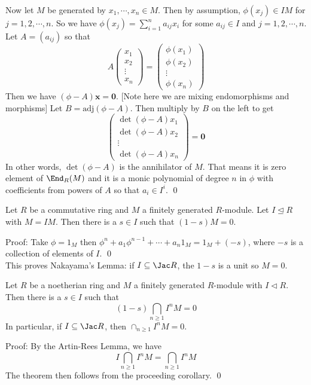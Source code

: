 Now let $M$ be generated by $x_1,\cdots,x_n \in M$. Then by assumption, $\phi(x_j) \in IM$ for $j=1,2,\cdots,n$. So we have $\phi(x_j)=\sum_{i=1}^n a_{ij} x_i$ for some $a_{ij} \in I$ and $j=1,2,\cdots,n$. Let $A=(a_{ij})$ so that 
\[
A \begin{pmatrix} x_1 \\ x_2 \\ \vdots \\ x_n \end{pmatrix}=\begin{pmatrix} \phi(x_1) \\ \phi(x_2) \\ \vdots \\ \phi(x_n) \end{pmatrix}
\]
Then we have $(\phi-A) \mathbf{x}= \mathbf{0}$. [Note here we are mixing endomorphisms and morphisms] Let $B=\text{adj}(\phi-A)$. Then multiply by $B$ on the left to get 
\[
\begin{pmatrix} \det(\phi-A)x_1 \\ \det(\phi-A)x_2 \\ \vdots \\ \det(\phi-A)x_n \end{pmatrix} = \mathbf{0}
\]
In other words, $\det(\phi-A)$ is the annihilator of $M$. That means it is zero element of $\End_R(M)$ and it is a monic polynomial of degree $n$ in $\phi$ with coefficients from powers of $A$ so that $a_i \in I^i$. \qed \\

\begin{cor}
Let $R$ be a commutative ring and $M$ a finitely generated $R$-module. Let $I \unlhd R$ with $M=IM$. Then there is a $s \in I$ such that $(1-s)M=0$. 
\end{cor}

\noindent Proof: Take $\phi=1_M$ then $\phi^n+a_1\phi^{n-1}+\cdots+a_n 1_M=1_M+(-s)$, where $-s$ is a collection of elements of $I$. \qed \\

This proves Nakayama's Lemma: if $I \subseteq \Jac R$, the $1-s$ is a unit so $M=0$. 

\begin{thmm}
Let $R$ be a noetherian ring and $M$ a finitely generated $R$-module with $I \lhd R$. Then there is a $s \in I$ such that 
\[
(1-s) \bigcap_{n \geq 1} I^nM = 0
\]
In particular, if $I \subseteq \Jac R$, then $\cap_{n \geq 1} I^n M=0$.
\end{thmm}

\noindent Proof: By the Artin-Rees Lemma, we have 
\[
I \bigcap_{n \geq 1} I^nM = \bigcap_{n \geq 1} I^nM
\]
The theorem then follows from the proceeding corollary. \qed \\